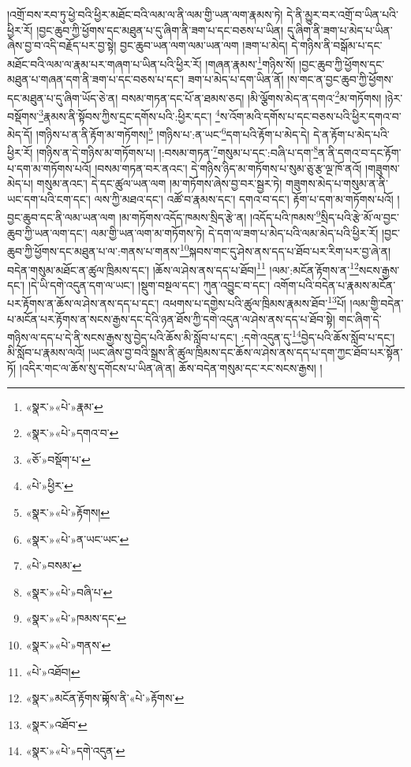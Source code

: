 །འགྲོ་བས་རབ་ཏུ་ཕྱེ་བའི་ཕྱིར་མཐོང་བའི་ལམ་ལ་ནི་ལམ་གྱི་ཡན་ལག་རྣམས་ཏེ། དེ་ནི་མྱུར་བར་འགྲོ་བ་ཡིན་པའི་ཕྱིར་རོ། །བྱང་ཆུབ་ཀྱི་ཕྱོགས་དང་མཐུན་པ་དུ་ཞིག་ནི་ཟག་པ་དང་བཅས་པ་ཡིན། དུ་ཞིག་ནི་ཟག་པ་མེད་པ་ཡིན་ཞེས་བྱ་བ་འདི་བརྗོད་པར་བྱ་སྟེ། བྱང་ཆུབ་ཡན་ལག་ལམ་ཡན་ལག །ཟག་པ་མེད། དེ་གཉིས་ནི་བསྒོམ་པ་དང་མཐོང་བའི་ལམ་ལ་རྣམ་པར་གཞག་པ་ཡིན་པའི་ཕྱིར་རོ། །གཞན་རྣམས་\footnote{«སྣར་»«པེ་»རྣམ་}གཉིས་སོ། །བྱང་ཆུབ་ཀྱི་ཕྱོགས་དང་མཐུན་པ་གཞན་དག་ནི་ཟག་པ་དང་བཅས་པ་དང་། ཟག་པ་མེད་པ་དག་ཡིན་ནོ། །ས་གང་ན་བྱང་ཆུབ་ཀྱི་ཕྱོགས་དང་མཐུན་པ་དུ་ཞིག་ཡོད་ཅེ་ན། བསམ་གཏན་དང་པོ་ན་ཐམས་ཅད། །མི་ལྕོགས་མེད་ན་དགའ་\footnote{«སྣར་»«པེ་»དགའ་བ་}མ་གཏོགས། །ཉེར་བསྡོགས་\footnote{«ཅོ་»བསྡོག་པ་}རྣམས་ནི་སྟོབས་ཀྱིས་དྲང་དགོས་པའི་:ཕྱིར་དང་། \footnote{«པེ་»ཕྱིར་}ས་འོག་མའི་དགོས་པ་དང་བཅས་པའི་ཕྱིར་དགའ་བ་མེད་དོ། །གཉིས་པ་ན་ནི་རྟོག་མ་གཏོགས།\footnote{«སྣར་»«པེ་»རྟོགས།} །གཉིས་པ་:ན་ཡང་\footnote{«སྣར་»«པེ་»ན་ཡང་ཡང་}དག་པའི་རྟོག་པ་མེད་དེ། དེ་ན་རྟོག་པ་མེད་པའི་ཕྱིར་རོ། །གཉིས་ན་དེ་གཉིས་མ་གཏོགས་པ། །:བསམ་གཏན་\footnote{«པེ་»བསམ་}གསུམ་པ་དང་:བཞི་པ་དག་\footnote{«སྣར་»«པེ་»བཞི་པ་}ན་ནི་དགའ་བ་དང་རྟོག་པ་དག་མ་གཏོགས་པའོ། །བསམ་གཏན་བར་ནའང་། དེ་གཉིས་ཉིད་མ་གཏོགས་པ་སུམ་ཅུ་རྩ་ལྔ་ཁོ་ནའོ། །གཟུགས་མེད་པ། གསུམ་ནའང་། དེ་དང་ཚུལ་ཡན་ལག །མ་གཏོགས་ཞེས་བྱ་བར་སྦྱར་ཏེ། གཟུགས་མེད་པ་གསུམ་ན་ནི་ཡང་དག་པའི་ངག་དང་། ལས་ཀྱི་མཐའ་དང་། འཚོ་བ་རྣམས་དང་། དགའ་བ་དང་། རྟོག་པ་དག་མ་གཏོགས་པའོ། །བྱང་ཆུབ་དང་ནི་ལམ་ཡན་ལག །མ་གཏོགས་འདོད་ཁམས་སྲིད་རྩེ་ན། །འདོད་པའི་ཁམས་\footnote{«སྣར་»«པེ་»ཁམས་དང་}སྲིད་པའི་རྩེ་མོ་ལ་བྱང་ཆུབ་ཀྱི་ཡན་ལག་དང་། ལམ་གྱི་ཡན་ལག་མ་གཏོགས་ཏེ། དེ་དག་ལ་ཟག་པ་མེད་པའི་ལམ་མེད་པའི་ཕྱིར་རོ། །བྱང་ཆུབ་ཀྱི་ཕྱོགས་དང་མཐུན་པ་ལ་:གནས་པ་གནས་\footnote{«སྣར་»«པེ་»གནས་}སྐབས་གང་དུ་ཤེས་ནས་དད་པ་ཐོབ་པར་རིག་པར་བྱ་ཞེ་ན། བདེན་གསུམ་མཐོང་ན་ཚུལ་ཁྲིམས་དང་། །ཆོས་ལ་ཤེས་ནས་དད་པ་ཐོབ།\footnote{«པེ་»འཐོབ།} །ལམ་:མངོན་རྟོགས་ན་\footnote{«སྣར་»མངོན་རྟོགས་ྟོགས་ནི་«པེ་»རྟོགས་}སངས་རྒྱས་དང་། །དེ་ཡི་དགེ་འདུན་དག་ལ་ཡང་། །སྡུག་བསྔལ་དང་། ཀུན་འབྱུང་བ་དང་། འགོག་པའི་བདེན་པ་རྣམས་མངོན་པར་རྟོགས་ན་ཆོས་ལ་ཤེས་ནས་དད་པ་དང་། འཕགས་པ་དགྱེས་པའི་ཚུལ་ཁྲིམས་རྣམས་ཐོབ་\footnote{«སྣར་»འཐོབ་}པོ། །ལམ་གྱི་བདེན་པ་མངོན་པར་རྟོགས་ན་སངས་རྒྱས་དང་དེའི་ཉན་ཐོས་ཀྱི་དགེ་འདུན་ལ་ཤེས་ནས་དད་པ་ཐོབ་སྟེ། གང་ཞིག་དེ་གཉིས་ལ་དད་པ་དེ་ནི་སངས་རྒྱས་སུ་བྱེད་པའི་ཆོས་མི་སློབ་པ་དང་། :དགེ་འདུན་དུ་\footnote{«སྣར་»«པེ་»དགེ་འདུན་}བྱེད་པའི་ཆོས་སློབ་པ་དང་། མི་སློབ་པ་རྣམས་ལའོ། །ཡང་ཞེས་བྱ་བའི་སྒྲས་ནི་ཚུལ་ཁྲིམས་དང་ཆོས་ལ་ཤེས་ནས་དད་པ་དག་ཀྱང་ཐོབ་པར་སྟོན་ཏོ། །འདིར་གང་ལ་ཆོས་སུ་དགོངས་པ་ཡིན་ཞེ་ན། ཆོས་བདེན་གསུམ་དང་རང་སངས་རྒྱས། །

